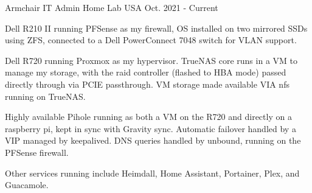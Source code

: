 \begin{cventries}
  \cventry
    {Armchair IT Admin} %
    {Home Lab} %
    {USA} %
    {Oct. 2021 - Current} %
    {
      \begin{cvitems} %
        \item {Dell R210 II running PFSense as my firewall, OS installed on two mirrored SSDs using ZFS, connected to a Dell PowerConnect 7048 switch for VLAN support.}
        \item {Dell R720 running Proxmox as my hypervisor. TrueNAS core runs in a VM to manage my storage, with the raid controller (flashed to HBA mode) passed directly through via PCIE passthrough. VM storage made available VIA nfs running on TrueNAS.}
        \item {Highly available Pihole running as both a VM on the R720 and directly on a raspberry pi, kept in sync with Gravity sync. Automatic failover handled by a VIP managed by keepalived. DNS queries handled by unbound, running on the PFSense firewall.}
        \item {Other services running include Heimdall, Home Assistant, Portainer, Plex, and Guacamole.}
      \end{cvitems}
    }

\end{cventries}
